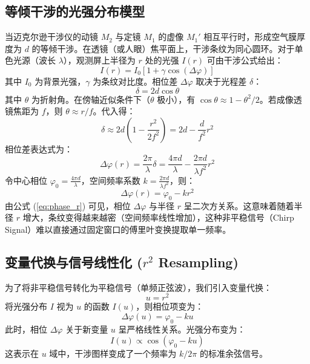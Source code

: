 \documentclass[twocolumn, a4paper, 10pt]{article}
\begin{document}
\subsection{等倾干涉的光强分布模型}
当迈克尔逊干涉仪的动镜 $M_2$ 与定镜 $M_1$ 的虚像 $M_1'$ 相互平行时，形成空气膜厚度为 $d$ 的等倾干涉。在透镜（或人眼）焦平面上，干涉条纹为同心圆环。对于单色光源（波长 $\lambda$），观测屏上半径为 $r$ 处的光强 $I(r)$ 可由干涉公式给出：
\begin{equation}
    I(r) = I_0 \left[ 1 + \gamma \cos(\Delta \varphi) \right]
\end{equation}
其中 $I_0$ 为背景光强，$\gamma$ 为条纹对比度。相位差 $\Delta \varphi$ 取决于光程差 $\delta$：
\begin{equation}
    \delta = 2d \cos \theta
\end{equation}
其中 $\theta$ 为折射角。在傍轴近似条件下（$\theta$ 极小），有 $\cos \theta \approx 1 - \theta^2 / 2$。若成像透镜焦距为 $f$，则 $\theta \approx r/f$。代入得：
\begin{equation}
    \delta \approx 2d \left( 1 - \frac{r^2}{2f^2} \right) = 2d - \frac{d}{f^2} r^2
\end{equation}
相位差表达式为：
\begin{equation}
    \Delta \varphi(r) = \frac{2\pi}{\lambda} \delta = \frac{4\pi d}{\lambda} - \frac{2\pi d}{\lambda f^2} r^2
\end{equation}
令中心相位 $\varphi_0 = \frac{4\pi d}{\lambda}$，空间频率系数 $k = \frac{2\pi d}{\lambda f^2}$，则：
\begin{equation}
    \Delta \varphi(r) = \varphi_0 - k r^2
    \label{eq:phase_r}
\end{equation}
由公式 (\ref{eq:phase_r}) 可见，相位 $\Delta \varphi$ 与半径 $r$ 呈二次方关系。这意味着随着半径 $r$ 增大，条纹变得越来越密（空间频率线性增加），这种非平稳信号（Chirp Signal）难以直接通过固定窗口的傅里叶变换提取单一频率。

\subsection{变量代换与信号线性化 ($r^2$ Resampling)}
为了将非平稳信号转化为平稳信号（单频正弦波），我们引入变量代换：
\begin{equation}
    u = r^2
\end{equation}
将光强分布 $I$ 视为 $u$ 的函数 $I(u)$，则相位项变为：
\begin{equation}
    \Delta \varphi(u) = \varphi_0 - k u
\end{equation}
此时，相位 $\Delta \varphi$ 关于新变量 $u$ 呈严格线性关系。光强分布变为：
\begin{equation}
    I(u) \propto \cos(\varphi_0 - k u)
\end{equation}
这表示在 $u$ 域中，干涉图样变成了一个频率为 $k/2\pi$ 的标准余弦信号。
\end{document}
